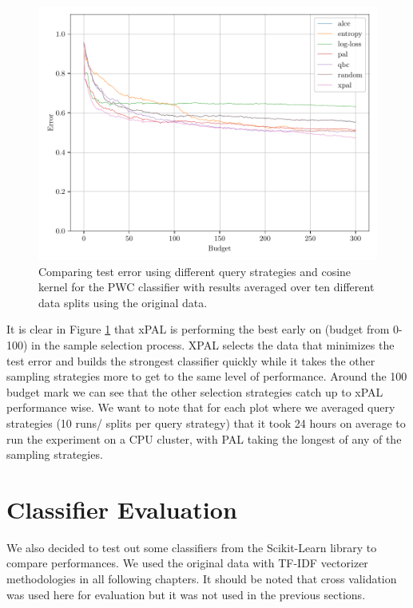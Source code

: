 \begin{figure}[ht]
    \centering
    \includegraphics[width=\textwidth]{../img/plot_text_data_original_proper_vectorizer_test_results}
    \caption{Comparing test error using different query strategies and cosine kernel for the PWC classifier with results averaged over ten different data splits using the original data.}
    \label{fig:cos_avg_test_results}
\end{figure}

It is clear in Figure \ref{fig:cos_avg_test_results} that xPAL is performing the best early on (budget from 0-100) in the sample selection process. XPAL selects the data that minimizes the test error and builds the strongest classifier quickly while it takes the other sampling strategies more to get to the same level of performance. Around the 100 budget mark we can see that the other selection strategies catch up to xPAL performance wise. We want to note that for each plot where we averaged query strategies (10 runs/ splits per query strategy) that it took 24 hours on average to run the experiment on a CPU cluster, with PAL taking the longest of any of the sampling strategies.

\newpage

\section{Classifier Evaluation}
\label{sec:classifier_evaluation}

We also decided to test out some classifiers from the Scikit-Learn library to compare performances. We used the original data with TF-IDF vectorizer methodologies in all following chapters. It should be noted that cross validation was used here for evaluation but it was not used in the previous sections.

